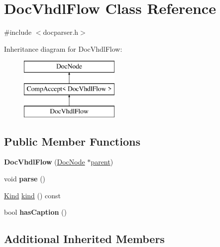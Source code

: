 \hypertarget{class_doc_vhdl_flow}{}\section{Doc\+Vhdl\+Flow Class Reference}
\label{class_doc_vhdl_flow}


{\ttfamily \#include $<$docparser.\+h$>$}

Inheritance diagram for Doc\+Vhdl\+Flow\+:\begin{figure}[H]
\begin{center}
\leavevmode
\includegraphics[height=3.000000cm]{class_doc_vhdl_flow}
\end{center}
\end{figure}
\subsection*{Public Member Functions}
\begin{DoxyCompactItemize}
\item 
\mbox{\label{class_doc_vhdl_flow_accbe4d668c89baf4b123d9f2453c7c22}} 
{\bfseries Doc\+Vhdl\+Flow} (\mbox{\hyperlink{class_doc_node}{Doc\+Node}} $\ast$\mbox{\hyperlink{class_doc_node_a73e8ad29a91cfceb0968eb00db71a23d}{parent}})
\item 
\mbox{\label{class_doc_vhdl_flow_afe55c9c5bf1a823e78d6aa3ea3f0777b}} 
void {\bfseries parse} ()
\item 
\mbox{\hyperlink{class_doc_node_aebd16e89ca590d84cbd40543ea5faadb}{Kind}} \mbox{\hyperlink{class_doc_vhdl_flow_a7171876a9227269a77abb93ce34b00d0}{kind}} () const
\item 
\mbox{\label{class_doc_vhdl_flow_a5b87893dd7549619f309c37386095ac8}} 
bool {\bfseries has\+Caption} ()
\end{DoxyCompactItemize}
\subsection*{Additional Inherited Members}


